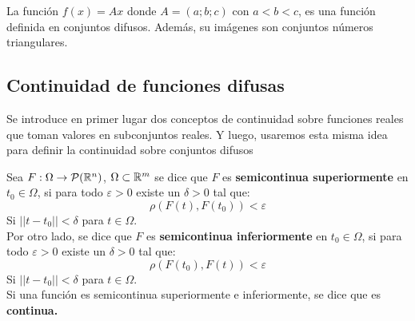   \begin{ejemplo}
    La función $f(x) = A x$ donde $A=(a;b;c)$ con $a<b<c$, es una función definida en conjuntos difusos. Además, su imágenes son conjuntos números triangulares.
  \end{ejemplo}

  \iffalse
  \begin{definicion}[Ristra de funciones difusas]
    Definimos una ristra de funciones difusas como el subconjunto difuso del espacio de funciones. \\
    Para cada ristra de funciones difusas, podemos darle una función definida en un conjunto difuso. Para cada $F \in \mathcal{F}(E(I; \IR^n))$ donde $E(I, \IR^n)$ es una espacio de funciones de $I \subset \IR$ a $\IR^n$. Donde:
    \[
      [F(t)]_\alpha = [F]_\alpha(t) = \{f(t) : f \in [F]_\alpha\}
      \]
  \end{definicion}

  \begin{ejemplo}
    Consideramos $f_1, f_2$ y $f_3$ funciones continuas en el intervalo $A=[a, b]$. Y definimos el conjunto difuso $F \in \mathcal{F}(C([a, b]; \IR))$ tal que:
    \[
    \mu_F(f) = \left\{
    \begin{array}{ccc}
      \alpha & si & f = f_1 + \alpha(f_2 - f_1) \\
      \alpha & si & f = f_3 + \alpha(f_2 - f_3) \\
      0 & otro~caso & 
    \end{array}
    \right.
    \]
    
    Entonces, decimos que $F$ es una ristra de funciones difusas.
  \end{ejemplo}

  \fi

  \subsection{Continuidad de funciones difusas}
  Se introduce en primer lugar dos conceptos de continuidad sobre funciones reales que toman valores en subconjuntos reales. Y luego, usaremos esta misma idea para definir la continuidad sobre conjuntos difusos

  \begin{definicion}
    \label{def:funcioncontinua}
    Sea $F : \Omega \rightarrow \mathcal{P}(\mathbb R^n)$, $\Omega \subset \mathbb R^m$ se dice que $F$ es \textbf{semicontinua superiormente} en $t_0 \in \Omega$, si para todo $\varepsilon>0$ existe un $\delta>0$ tal que:
    \[
    \rho(F(t), F(t_0))<\varepsilon
    \]
    Si $||t-t_0||<\delta$ para $t \in \Omega$. \\
    Por otro lado, se dice que $F$  es \textbf{semicontinua inferiormente} en $t_0 \in \Omega$, si para todo $\varepsilon>0$ existe un $\delta>0$ tal que:
    \[
    \rho(F(t_0), F(t))<\varepsilon
    \]
    Si $||t-t_0||<\delta$ para $t \in \Omega$. \\
    Si una función es semicontinua superiormente e inferiormente, se dice que es \textbf{continua.}
  \end{definicion}

